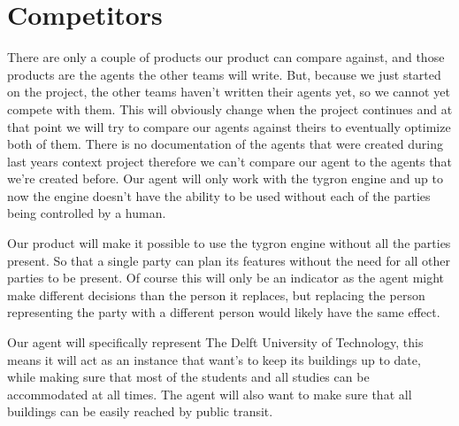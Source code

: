 \section{Competitors}
There are only a couple of products our product can compare against, and those products are the agents the other teams will write. But, because we just started on the project, the other teams haven't written their agents yet, so we cannot yet compete with them. This will obviously change when the project continues and at that point we will try to compare our agents against theirs to eventually optimize both of them. There is no documentation of the agents that were created during last years context project therefore we can’t compare our agent to the agents that we’re created before. Our agent will only work with the tygron engine and up to now the engine doesn’t have the ability to be used without each of the parties being controlled by a human. 
\par
Our product will make it possible to use the tygron engine without all the parties present. So that a single party can plan its features without the need for all other parties to be present. Of course this will only be an indicator as the agent might make different decisions than the person it replaces, but replacing the person representing the party with a different person would likely have the same effect. 
\par
Our agent will specifically represent The Delft University of Technology, this means it will act as an instance that want’s to keep its buildings up to date, while making sure that most of the students and all studies can be accommodated at all times. The agent will also want to make sure that all buildings can be easily reached by public transit.
